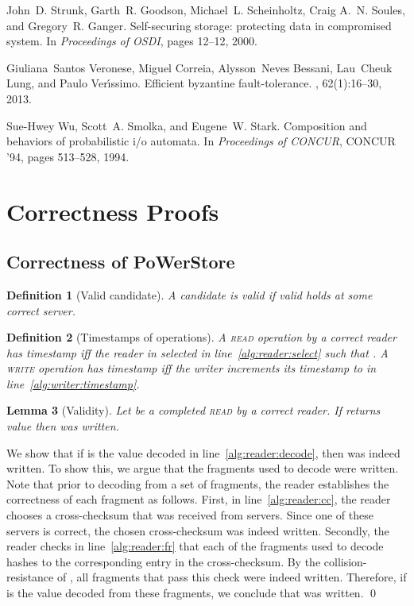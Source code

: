 \documentclass[10pt,conference,compsocconf]{IEEEtran}
\newcommand{\protocol}{PoWerStore}
\newtheorem{defn}{Definition}[section]
\newtheorem{la}[defn]{Lemma}
\newenvironment{prooff}{\vspace{1ex}\noindent{\bf Proof:}\hspace{0.5em}}
	{\hfill\qed\vspace{1em}}
\begin{document}
\begin{thebibliography}{10}
John~D. Strunk, Garth~R. Goodson, Michael~L. Scheinholtz, Craig A.~N. Soules,
  and Gregory~R. Ganger.
\newblock Self-securing storage: protecting data in compromised system.
\newblock In {\em Proceedings of OSDI}, pages 12--12, 2000.

Giuliana~Santos Veronese, Miguel Correia, Alysson~Neves Bessani, Lau~Cheuk
  Lung, and Paulo Ver\'{\i}ssimo.
\newblock Efficient byzantine fault-tolerance.
, 62(1):16--30, 2013.

Sue-Hwey Wu, Scott~A. Smolka, and Eugene~W. Stark.
\newblock Composition and behaviors of probabilistic i/o automata.
\newblock In {\em Proceedings of CONCUR}, CONCUR '94, pages 513--528, 1994.

\end{thebibliography}


\newpage

\appendix

\section{Correctness Proofs}
\subsection{Correctness of \protocol}

\begin{defn}[Valid candidate] \label{def:validcand}
A candidate  is \emph{valid} if \emph{\textsf{valid}} holds at some correct server.
\end{defn}


\begin{defn}[Timestamps of operations]
A \textsc{read} operation  by a correct reader has timestamp  iff the reader in  selected 
in line~\ref{alg:reader:select} such that . A \textsc{write} operation  has timestamp  iff
the writer increments its timestamp to  in line~\ref{alg:writer:timestamp}.
\end{defn}

\begin{la}[Validity]\label{la:validity}
Let  be a completed \textsc{read} by a correct reader. If  returns value  then  was written.
\end{la}
\begin{prooff} We show that if  is the value decoded in line~\ref{alg:reader:decode}, then  was indeed written. To show this, we argue that the fragments used to decode  were written. Note that prior to decoding  from a set of fragments, the reader establishes the correctness of each fragment as follows. First, in line~\ref{alg:reader:cc}, the reader chooses a cross-checksum that was received from  servers. Since one of these servers is correct, the chosen cross-checksum was indeed written. Secondly, the reader checks in line~\ref{alg:reader:fr} that each of the  fragments used to decode  hashes to the corresponding entry in the cross-checksum.  By the collision-resistance of , all fragments that pass this check were indeed written. Therefore, if  is the value decoded from these fragments, we conclude that  was written.
\end{prooff}
\end{document}
